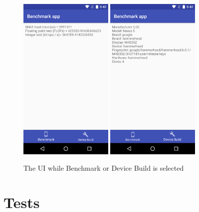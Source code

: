 \documentclass[a4paper,10pt]{report}
\begin{document}
 \begin{figure}[h]
  \centering
  \includegraphics[width=0.4\textwidth]{Screenshot_20180523-214203.png}
  \quad
  \includegraphics[width=0.4\textwidth]{Screenshot_20180523-214209.png}
  \caption{The UI while Benchmark or Device Build is selected}
  \label{fig:uiBench}
  
 \end{figure}
 
 \section{Tests}
\end{document}
